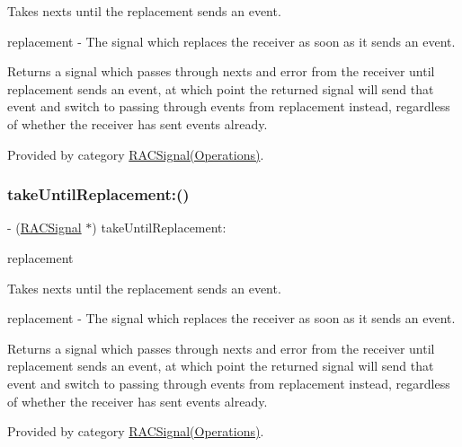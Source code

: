 Takes {\ttfamily next}s until the {\ttfamily replacement} sends an event.

replacement -\/ The signal which replaces the receiver as soon as it sends an event.

Returns a signal which passes through {\ttfamily next}s and {\ttfamily error} from the receiver until {\ttfamily replacement} sends an event, at which point the returned signal will send that event and switch to passing through events from {\ttfamily replacement} instead, regardless of whether the receiver has sent events already. 

Provided by category \mbox{\hyperlink{category_r_a_c_signal_07_operations_08_aa8536c9726338e10176997936be011ed}{R\+A\+C\+Signal(\+Operations)}}.

\mbox{\label{interface_r_a_c_signal_aa8536c9726338e10176997936be011ed}} 
\subsubsection{\texorpdfstring{take\+Until\+Replacement\+:()}{takeUntilReplacement:()}\hspace{0.1cm}{\footnotesize\ttfamily [3/3]}}
{\footnotesize\ttfamily -\/ (\mbox{\hyperlink{interface_r_a_c_signal}{R\+A\+C\+Signal}} $\ast$) take\+Until\+Replacement\+: \begin{DoxyParamCaption}\item[{(\mbox{\hyperlink{interface_r_a_c_signal}{R\+A\+C\+Signal}} $\ast$)}]{replacement }\end{DoxyParamCaption}}

Takes {\ttfamily next}s until the {\ttfamily replacement} sends an event.

replacement -\/ The signal which replaces the receiver as soon as it sends an event.

Returns a signal which passes through {\ttfamily next}s and {\ttfamily error} from the receiver until {\ttfamily replacement} sends an event, at which point the returned signal will send that event and switch to passing through events from {\ttfamily replacement} instead, regardless of whether the receiver has sent events already. 

Provided by category \mbox{\hyperlink{category_r_a_c_signal_07_operations_08_aa8536c9726338e10176997936be011ed}{R\+A\+C\+Signal(\+Operations)}}.

